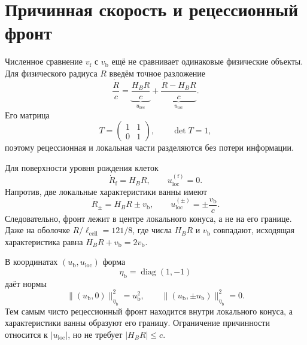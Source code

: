 \chapter{Причинная скорость и рецессионный фронт}
\label{ch:v10-bath-causal-recession-separation}

Численное сравнение $v_{\mathrm f}$ с $v_{\mathrm b}$ ещё не сравнивает
одинаковые физические объекты. Для физического радиуса $R$ введём точное
разложение
\begin{equation}
 \frac{\dot R}{c}
 =\underbrace{\frac{H_BR}{c}}_{u_{\mathrm{rec}}}
 +\underbrace{\frac{\dot R-H_BR}{c}}_{u_{\mathrm{loc}}}.
 \label{eq:v10-causal-recession-split}
\end{equation}
Его матрица
\begin{equation}
 T=\begin{pmatrix}1&1\\0&1\end{pmatrix},
 \qquad \det T=1,
\end{equation}
поэтому рецессионная и локальная части разделяются без потери информации.

Для поверхности уровня рождения клеток
\begin{equation}
 \dot R_{\mathrm f}=H_BR,
 \qquad u_{\mathrm{loc}}^{(\mathrm f)}=0.
\end{equation}
Напротив, две локальные характеристики ванны имеют
\begin{equation}
 \dot R_\pm=H_BR\pm v_{\mathrm b},
 \qquad
 u_{\mathrm{loc}}^{(\pm)}=\pm\frac{v_{\mathrm b}}c.
 \label{eq:v10-bath-local-characteristics}
\end{equation}
Следовательно, фронт лежит в центре локального конуса, а не на его границе.
Даже на оболочке $R/\ell_{\mathrm{cell}}=121/8$, где числа
$H_BR$ и $v_{\mathrm b}$ совпадают, исходящая характеристика равна
$H_BR+v_{\mathrm b}=2v_{\mathrm b}$.

В координатах $(u_{\mathrm b},u_{\mathrm{loc}})$ форма
\begin{equation}
 \eta_{\mathrm b}=\operatorname{diag}(1,-1)
\end{equation}
даёт нормы
\begin{equation}
 \|(u_{\mathrm b},0)\|_{\eta_{\mathrm b}}^2=u_{\mathrm b}^2,
 \qquad
 \|(u_{\mathrm b},\pm u_{\mathrm b})\|_{\eta_{\mathrm b}}^2=0.
\end{equation}
Тем самым чисто рецессионный фронт находится внутри локального конуса, а
характеристики ванны образуют его границу. Ограничение причинности относится
к $|u_{\mathrm{loc}}|$, но не требует $|H_BR|\leq c$.

